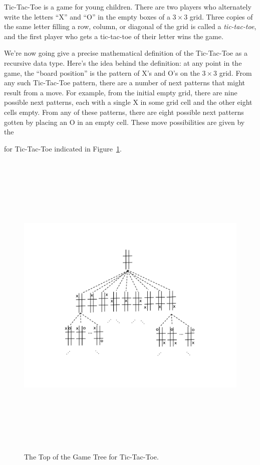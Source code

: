 \begin{definition}
Tic-Tac-Toe is a game for young children.  There are two players who
alternately write the letters ``X'' and ``O'' in the empty boxes of a $3
\times 3$ grid.  Three copies of the same letter filling a row, column, or
diagonal of the grid is called a \emph{tic-tac-toe}, and the first player
who gets a tic-tac-toe of their letter wins the game.  


We're now going give a precise mathematical definition of the Tic-Tac-Toe
 as a recursive data type.  Here's the idea behind the definition: at any point in the
game, the ``board position'' is the pattern of X's and O's on the $3 \times
3$ grid.  From any such Tic-Tac-Toe pattern, there are a number of next
patterns that might result from a move.  For example, from the initial
empty grid, there are nine possible next patterns, each with a single X in
some grid cell and the other eight cells empty.  From any of these
patterns, there are eight possible next patterns gotten by placing an O in
an empty cell.  These move possibilities are given by the
 for Tic-Tac-Toe indicated in
Figure~\ref{fig:Tic-Tac-Toe}.

\begin{figure}[htbp]
\centering
\includegraphics[height=6in]{figures/topgame.pdf}
\caption{The Top of the Game Tree for Tic-Tac-Toe.}
\label{fig:Tic-Tac-Toe}
\end{figure}



\end{definition}
